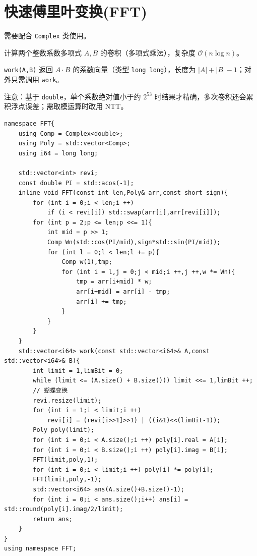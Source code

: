 \section{快速傅里叶变换(FFT)}

需要配合 \texttt{Complex} 类使用。

计算两个整数系数多项式 $A,B$ 的卷积（多项式乘法），复杂度 $\mathcal{O}(n\log n)$。

\texttt{work(A,B)} 返回 $A\cdot B$ 的系数向量（类型 \texttt{long long}），长度为 $|A|+|B|-1$；对外只需调用 \texttt{work}。

注意：基于 \texttt{double}，单个系数绝对值小于约 $2^{53}$ 时结果才精确，多次卷积还会累积浮点误差；需取模运算时改用 NTT。

\begin{lstlisting}
namespace FFT{
    using Comp = Complex<double>;
    using Poly = std::vector<Comp>;
    using i64 = long long;

    std::vector<int> revi;
    const double PI = std::acos(-1);
    inline void FFT(const int len,Poly& arr,const short sign){
        for (int i = 0;i < len;i ++)
            if (i < revi[i]) std::swap(arr[i],arr[revi[i]]);
        for (int p = 2;p <= len;p <<= 1){
            int mid = p >> 1;
            Comp Wn(std::cos(PI/mid),sign*std::sin(PI/mid));
            for (int l = 0;l < len;l += p){
                Comp w(1),tmp;
                for (int i = l,j = 0;j < mid;i ++,j ++,w *= Wn){
                    tmp = arr[i+mid] * w;
                    arr[i+mid] = arr[i] - tmp;
                    arr[i] += tmp;
                }
            }
        }
    }
    std::vector<i64> work(const std::vector<i64>& A,const std::vector<i64>& B){
        int limit = 1,limBit = 0;
        while (limit <= (A.size() + B.size())) limit <<= 1,limBit ++;
        // 蝴蝶变换
        revi.resize(limit);
        for (int i = 1;i < limit;i ++)
            revi[i] = (revi[i>>1]>>1) | ((i&1)<<(limBit-1));
        Poly poly(limit);
        for (int i = 0;i < A.size();i ++) poly[i].real = A[i];
        for (int i = 0;i < B.size();i ++) poly[i].imag = B[i];
        FFT(limit,poly,1);
        for (int i = 0;i < limit;i ++) poly[i] *= poly[i];
        FFT(limit,poly,-1);
        std::vector<i64> ans(A.size()+B.size()-1);
        for (int i = 0;i < ans.size();i++) ans[i] = std::round(poly[i].imag/2/limit);
        return ans;
    }
}
using namespace FFT;
\end{lstlisting}

